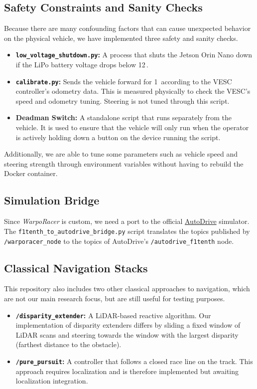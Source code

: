 \documentclass[11pt,letterpaper]{article}
\begin{document}
\subsection{Safety Constraints and Sanity Checks}
Because there are many confounding factors that can cause unexpected behavior on the physical vehicle, we have implemented three safety and sanity checks.
\begin{itemize}
    \item \textbf{\texttt{low\_voltage\_shutdown.py}:} A process that shuts the Jetson Orin Nano down if the LiPo battery voltage drops below 12\,.
    \item \textbf{\texttt{calibrate.py}:} Sends the vehicle forward for 1\, according to the VESC controller's odometry data. This is measured physically to check the VESC's speed and odometry tuning. Steering is not tuned through this script.
    \item \textbf{Deadman Switch:} A standalone script that runs separately from the vehicle. It is used to ensure that the vehicle will only run when the operator is actively holding down a button on the device running the script.
\end{itemize}

Additionally, we are able to tune some parameters such as vehicle speed and steering strength through environment variables without having to rebuild the Docker container.

\subsection{Simulation Bridge}
Since \textit{WarpoRacer} is custom, we need a port to the official \href{https://autodrive-ecosystem.github.io/}{AutoDrive} simulator. 
The \texttt{f1tenth\_\allowbreak to\_\allowbreak autodrive\_\allowbreak bridge.py} script translates the topics published by \texttt{/warporacer\_node} to the topics of AutoDrive's \texttt{/autodrive\_f1tenth} node.

\subsection{Classical Navigation Stacks}
This repository also includes two other classical approaches to navigation, which are not our main research focus, but are still useful for testing purposes.
\begin{itemize}
    \item \textbf{\texttt{/disparity\_extender}:} A LiDAR-based reactive algorithm. Our implementation of disparity extenders differs by sliding a fixed window of LiDAR scans and steering towards the window with the largest disparity (farthest distance to the obstacle).
    \item \textbf{\texttt{/pure\_pursuit}:} A controller that follows a closed race line on the track. This approach requires localization and is therefore implemented but awaiting localization integration.
\end{itemize}
\end{document}
